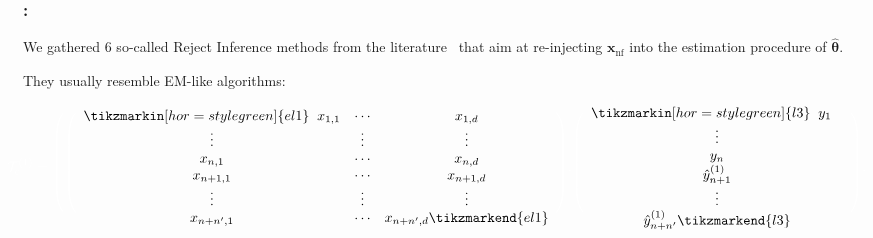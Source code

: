 \documentclass[english,xcolor={rgb,dvipsnames,table,usenames}]{beamer}
\newcommand{\f}{\text{f}}
\newcommand{\nf}{\text{nf}}
\begin{document}
\begin{frame}
\frametitle{\secname : \subsecname}

We gathered 6 so-called Reject Inference methods from the literature~\cite{economix,saporta,RI6,banasik} that aim at re-injecting $\bm{\mathbf{x}}_{\nf}$ into the estimation procedure of $\hat{\bm{\theta}}$.

\medskip

They usually resemble EM-like algorithms:


\[ \hspace*{-0.8cm}\textcolor{white}{\mathcal{T}_{\text{c}}^{(1)} = {\Huge \Bigg(}}
\textcolor{white}{{\Huge \Bigg(}}
\begin{array}{ccc}
\tikzmarkin[hor=style green]{el1} \; \; x_{1,1} & \cdots & x_{1,d}  \\
 \vdots & \vdots & \vdots \\
 x_{n,1} & \cdots & x_{n,d} \\
 x_{n+1,1} & \cdots & x_{n+1,d}  \\
 \vdots & \vdots & \vdots \\
 x_{n+n',1} & \cdots & x_{n+n',d} \tikzmarkend{el1} \end{array} \textcolor{white}{{\Huge \Bigg)},}
\textcolor{white}{{\Huge \Bigg(}}
\begin{array}{c}
\tikzmarkin[hor=style green]{l3} \; \; y_1 \; \; \; \\
\vdots \\
 y_n \\ 
 \hat{y}_{n+1}^{(1)} \\
\vdots \\
\hat{y}_{n+n'}^{(1)} \tikzmarkend{l3}\end{array} \textcolor{white}{{\Huge \Bigg)},}
\]
\end{frame}
\end{document}

